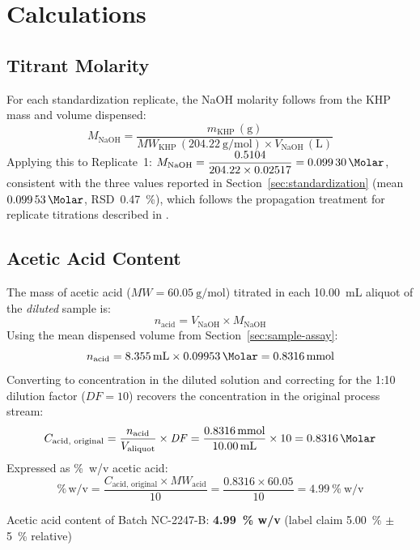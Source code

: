 \section{Calculations}
\sectionrule

\subsection{Titrant Molarity}
For each standardization replicate, the NaOH molarity follows from the KHP mass and volume
dispensed:
\[
  M_{\text{NaOH}} = \frac{m_{\text{KHP}}\,(\si{\gram})}{\mathit{MW}_{\text{KHP}}\,(\SI{204.22}{\gram\per\mole}) \times V_{\text{NaOH}}\,(\si{\liter})}
\]
Applying this to Replicate~1: $M_{\text{NaOH}} = \dfrac{0.5104}{204.22 \times 0.02517} = \SI{0.09930}{\Molar}$,
consistent with the three values reported in Section~\ref{sec:standardization}
(mean $\SI{0.09953}{\Molar}$, RSD~\SI{0.47}{\percent}), which follows the propagation
treatment for replicate titrations described in \citet{skoog2018}.

\subsection{Acetic Acid Content}
The mass of acetic acid ($\mathit{MW} = \SI{60.05}{\gram\per\mole}$) titrated in each
10.00~mL aliquot of the \emph{diluted} sample is:
\[
  n_{\text{acid}} = V_{\text{NaOH}} \times M_{\text{NaOH}}
\]
Using the mean dispensed volume from Section~\ref{sec:sample-assay}:
\[
  n_{\text{acid}} = 8.355\,\si{\milli\liter} \times 0.09953\,\si{\Molar} = 0.8316\,\si{\milli\mole}
\]
Converting to concentration in the diluted solution and correcting for the 1:10 dilution
factor ($\mathit{DF} = 10$) recovers the concentration in the original process stream:
\[
  C_{\text{acid, original}} = \frac{n_{\text{acid}}}{V_{\text{aliquot}}} \times \mathit{DF}
  = \frac{0.8316\,\si{\milli\mole}}{10.00\,\si{\milli\liter}} \times 10 = 0.8316\,\si{\Molar}
\]
Expressed as \%~w/v acetic acid:
\[
  \%\,\text{w/v} = \frac{C_{\text{acid, original}} \times \mathit{MW}_{\text{acid}}}{10}
  = \frac{0.8316 \times 60.05}{10} = \SI{4.99}{\percent}\ \text{w/v}
\]

\begin{tcolorbox}[databox,title=Result]
\centering\large
Acetic acid content of Batch NC-2247-B: \textbf{\SI{4.99}{\percent} w/v}
\quad(label claim \SI{5.00}{\percent} $\pm$ \SI{5}{\percent} relative)
\end{tcolorbox}
